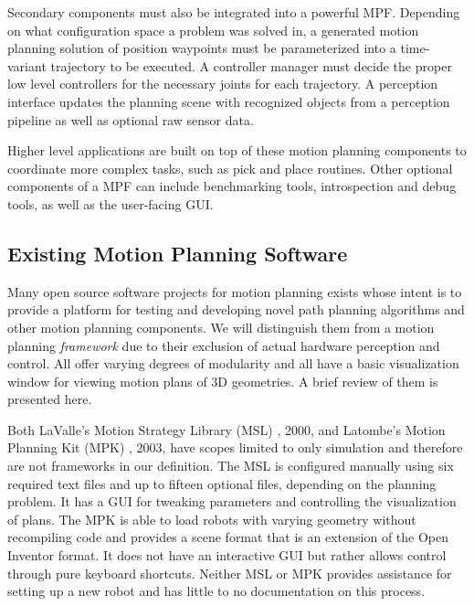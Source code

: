 \documentclass[10pt,journal,compsoc]{joser1}
\begin{document}
{Secondary components must also be integrated into a powerful MPF. Depending on what configuration space a problem was solved in, a generated motion planning solution of position waypoints must be parameterized into a time-variant trajectory to be executed. A controller manager must decide the proper low level controllers for the necessary joints for each trajectory. A perception interface updates the planning scene with recognized objects from a perception pipeline as well as optional raw sensor data.

Higher level applications are built on top of these motion planning components to coordinate more complex tasks, such as pick and place routines. Other optional components of a MPF can include benchmarking tools, introspection and debug tools, as well as the user-facing GUI.

\subsection{Existing Motion Planning Software}
\label{sec::existing}

Many open source software projects for motion planning exists whose intent is to provide a platform for testing and developing novel path planning algorithms and other motion planning components. We will distinguish them from a motion planning \textit{framework} due to their exclusion of actual hardware perception and control. All offer varying degrees of modularity and all have a basic visualization window for viewing motion plans of 3D geometries. A brief review of them is presented here.

Both LaValle's Motion Strategy Library (MSL) \cite{lavallemsl}, 2000, and Latombe's Motion Planning Kit (MPK) \cite{mpk}, 2003, have scopes limited to only simulation and therefore are not frameworks in our definition. The MSL is configured manually using six required text files and up to fifteen optional files, depending on the planning problem. It has a GUI for tweaking parameters and controlling the visualization of plans. The MPK is able to load robots with varying geometry without recompiling code and provides a scene format that is an extension of the Open Inventor format. It does not have an interactive GUI but rather allows control through pure keyboard shortcuts. Neither MSL or MPK provides assistance for setting up a new robot and has little to no documentation on this process.

}
\end{document}
